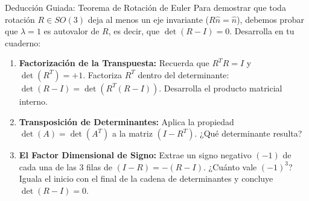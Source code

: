 \documentclass[10pt,aspectratio=169]{beamer}
\begin{document}
\begin{frame}{Deducción Guiada: Teorema de Rotación de Euler}
  \vspace{0.05cm}
  Para demostrar que toda rotación $R \in SO(3)$ deja al menos un eje invariante ($R\hat{n} = \hat{n}$), debemos probar que $\lambda = 1$ es autovalor de $R$, es decir, que $\det(R - I) = 0$. Desarrolla en tu cuaderno:
  \vspace{0.22cm}
  \begin{enumerate}\itemsep10pt
    \item[(a)] \textbf{Factorización de la Transpuesta:} Recuerda que $R^T R = I$ y $\det(R^T) = +1$. Factoriza $R^T$ dentro del determinante: $\det(R - I) = \det(R^T(R - I))$. Desarrolla el producto matricial interno.
    \item[(b)] \textbf{Transposición de Determinantes:} Aplica la propiedad $\det(A) = \det(A^T)$ a la matriz $(I - R^T)$. ¿Qué determinante resulta?
    \item[(c)] \textbf{El Factor Dimensional de Signo:} Extrae un signo negativo $(-1)$ de cada una de las 3 filas de $(I - R) = -(R - I)$. ¿Cuánto vale $(-1)^3$? Iguala el inicio con el final de la cadena de determinantes y concluye $\det(R - I) = 0$.
  \end{enumerate}
\end{frame}
\end{document}
